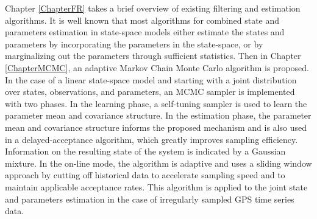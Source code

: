 Chapter \ref{ChapterFR} takes a brief overview of existing filtering and estimation algorithms. It is well known that most algorithms for combined state and parameters estimation in state-space models either estimate the states and parameters by incorporating the parameters in the state-space, or by marginalizing out the parameters through sufficient statistics. Then in Chapter \ref{ChapterMCMC}, an adaptive Markov Chain Monte Carlo algorithm is proposed. In the case of a linear state-space model and starting with a joint distribution over states, observations, and parameters, an MCMC sampler is implemented with two phases. In the learning phase, a self-tuning sampler is used to learn the parameter mean and covariance structure. In the estimation phase, the parameter mean and covariance structure informs the proposed mechanism and is also used in a delayed-acceptance algorithm, which greatly improves sampling efficiency. Information on the resulting state of the system is indicated by a Gaussian mixture. In the on-line mode, the algorithm is adaptive and uses a sliding window approach by cutting off historical data to accelerate sampling speed and to maintain applicable acceptance rates. This algorithm is applied to the joint state and parameters estimation in the case of irregularly sampled GPS time series data. 
